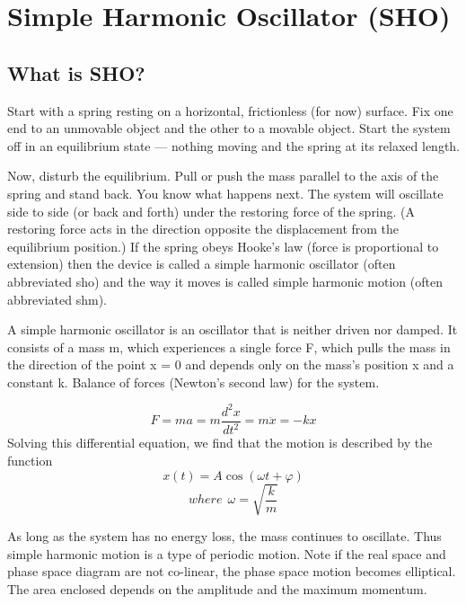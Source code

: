 
\newpage
\section{Simple Harmonic Oscillator (SHO)}
\subsection{What is SHO?}
	Start with a spring resting on a horizontal, frictionless (for now) surface. Fix one end to an unmovable object and the other to a movable object. Start the system off in an equilibrium state — nothing moving and the spring at its relaxed length.

	Now, disturb the equilibrium. Pull or push the mass parallel to the axis of the spring and stand back. You know what happens next. The system will oscillate side to side (or back and forth) under the restoring force of the spring. (A restoring force acts in the direction opposite the displacement from the equilibrium position.) If the spring obeys Hooke's law (force is proportional to extension) then the device is called a simple harmonic oscillator (often abbreviated sho) and the way it moves is called simple harmonic motion (often abbreviated shm).

	A simple harmonic oscillator is an oscillator that is neither driven nor damped. It consists of a mass m, which experiences a single force F, which pulls the mass in the direction of the point x = 0 and depends only on the mass's position x and a constant k. Balance of forces (Newton's second law) for the system.
	

	\begin{equation}
	F=ma=m\frac{d^2x}{dt^2} = m\ddot{x} = -kx
	\end{equation}
	Solving this differential equation, we find that the motion is described by the function
	\begin{equation}
	x(t)= A \cos(\omega t + \varphi)
	\end{equation}
	\begin{equation}
	where \ \ \omega = \sqrt{\frac{k}{m}}
	\end{equation}
	
	As long as the system has no energy loss, the mass continues to oscillate. Thus simple harmonic motion is a type of periodic motion. Note if the real space and phase space diagram are not co-linear, the phase space motion becomes elliptical. The area enclosed depends on the amplitude and the maximum momentum.
	
